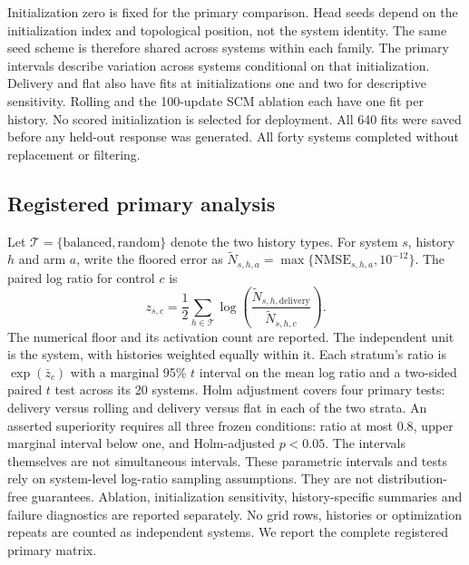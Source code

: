 Initialization zero is fixed for the primary comparison. Head seeds depend on
the initialization index and topological position, not the system identity.
The same seed scheme is therefore shared across systems within each family.
The primary intervals describe variation across systems conditional on that
initialization. Delivery and flat also have fits at initializations one and two
for descriptive sensitivity. Rolling and the 100-update SCM ablation each have
one fit per history. No scored initialization is selected for deployment.
All 640 fits were saved before any held-out response was generated. All forty
systems completed without replacement or filtering.

\subsection{Registered primary analysis}
Let $\mathcal T=\{\mathrm{balanced},\mathrm{random}\}$ denote the two history types.
For system $s$, history $h$ and arm $a$, write the floored error as
$\widetilde N_{s,h,a}=\max\{\mathrm{NMSE}_{s,h,a},10^{-12}\}$.
The paired log ratio for control $c$ is
\begin{equation}
 z_{s,c}=\frac{1}{2}\sum_{h\in\mathcal T}
 \log\!\left(
   \frac{\widetilde N_{s,h,\mathrm{delivery}}}{\widetilde N_{s,h,c}}
 \right).
 \label{eq:paired-analysis}
\end{equation}
The numerical floor and its activation count are reported. The independent
unit is the system, with histories weighted equally within it. Each stratum's
ratio is $\exp(\bar z_c)$ with a marginal 95\% $t$ interval on the mean log
ratio and a two-sided paired $t$ test across its 20 systems. Holm adjustment
covers four primary tests: delivery versus rolling and delivery versus flat
in each of the two strata. An asserted superiority requires all three frozen
conditions: ratio at most $0.8$, upper marginal interval below one, and
Holm-adjusted $p<0.05$. The intervals themselves are not simultaneous intervals.
These parametric intervals and tests rely on system-level log-ratio sampling
assumptions. They are not distribution-free guarantees. Ablation, initialization
sensitivity, history-specific summaries and failure diagnostics are reported
separately. No grid rows, histories or optimization
repeats are counted as independent systems. We report the complete registered primary matrix.


